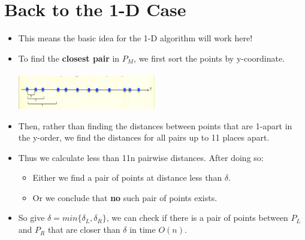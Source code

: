 \documentclass[12pt]{article}
\begin{document}
\section{Back to the 1-D Case}
\renewcommand{\labelitemii}{$\circ$}
\renewcommand{\labelitemiii}{$\cdot$}
\renewcommand{\labelitemiii}{$\rightarrow$}
\renewcommand{\labelitemiv}{$\star$}	
\begin{itemize}
\item This means the basic idea for the 1-D algorithm will work here!
\item To find the \textbf{closest pair} in $P_M$, we first sort the points by y-coordinate.\\
\\
\includegraphics{lecture612}
\item Then, rather than finding the distances between points that are 1-apart in the y-order, we find the distances for all pairs up to 11 places apart.
\item Thus we calculate less than 11n pairwise distances. After doing so:
	\begin{itemize}
	\item Either we find a pair of points at distance less than $\delta$.
	\item Or we conclude that \textbf{no} such pair of points exists.
	\end{itemize} 
\item So give $\delta = min\{\delta_L, \delta_R\}$, we can check if there is a pair of points between $P_L$ and $P_R$ that are closer than $\delta$ in time $O(n)$.
\end{itemize}
\end{document}
